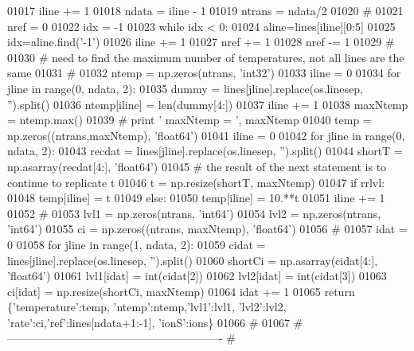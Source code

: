 \begin{DoxyCode}
01017         iline += 1
01018     ndata = iline - 1
01019     ntrans = ndata/2
01020     \textcolor{comment}{#}
01021     nref = 0
01022     idx = -1
01023     \textcolor{keywordflow}{while} idx < 0:
01024         aline=lines[iline][0:5]
01025         idx=aline.find(\textcolor{stringliteral}{'-1'})
01026         iline += 1
01027         nref += 1
01028     nref -= 1
01029     \textcolor{comment}{#}
01030     \textcolor{comment}{# need to find the maximum number of temperatures, not all lines are the same}
01031     \textcolor{comment}{#}
01032     ntemp = np.zeros(ntrans, \textcolor{stringliteral}{'int32'})
01033     iline = 0
01034     \textcolor{keywordflow}{for} jline \textcolor{keywordflow}{in} range(0, ndata, 2):
01035         dummy = lines[jline].replace(os.linesep, \textcolor{stringliteral}{''}).split()
01036         ntemp[iline] = len(dummy[4:])
01037         iline += 1
01038     maxNtemp = ntemp.max()
01039 \textcolor{comment}{#   print ' maxNtemp = ', maxNtemp}
01040     temp = np.zeros((ntrans,maxNtemp), \textcolor{stringliteral}{'float64'})
01041     iline = 0
01042     \textcolor{keywordflow}{for} jline \textcolor{keywordflow}{in} range(0, ndata, 2):
01043         recdat = lines[jline].replace(os.linesep, \textcolor{stringliteral}{''}).split()
01044         shortT = np.asarray(recdat[4:], \textcolor{stringliteral}{'float64'})
01045         \textcolor{comment}{# the result of the next statement is to continue to replicate t}
01046         t = np.resize(shortT, maxNtemp)
01047         \textcolor{keywordflow}{if} rrlvl:
01048             temp[iline] = t
01049         \textcolor{keywordflow}{else}:
01050             temp[iline] = 10.**t
01051         iline += 1
01052     \textcolor{comment}{#}
01053     lvl1 = np.zeros(ntrans, \textcolor{stringliteral}{'int64'})
01054     lvl2 = np.zeros(ntrans, \textcolor{stringliteral}{'int64'})
01055     ci = np.zeros((ntrans, maxNtemp), \textcolor{stringliteral}{'float64'})
01056     \textcolor{comment}{#}
01057     idat = 0
01058     \textcolor{keywordflow}{for} jline \textcolor{keywordflow}{in} range(1, ndata, 2):
01059         cidat = lines[jline].replace(os.linesep, \textcolor{stringliteral}{''}).split()
01060         shortCi = np.asarray(cidat[4:], \textcolor{stringliteral}{'float64'})
01061         lvl1[idat] = int(cidat[2])
01062         lvl2[idat] = int(cidat[3])
01063         ci[idat] = np.resize(shortCi, maxNtemp)
01064         idat += 1
01065     \textcolor{keywordflow}{return} \{\textcolor{stringliteral}{'temperature'}:temp, \textcolor{stringliteral}{'ntemp'}:ntemp,\textcolor{stringliteral}{'lvl1'}:lvl1, \textcolor{stringliteral}{'lvl2'}:lvl2, \textcolor{stringliteral}{'rate'}:ci,\textcolor{stringliteral}{'ref'}:lines[ndata+1:-1], \textcolor{stringliteral}{
      'ionS'}:ions\}
01066     \textcolor{comment}{#}
01067     \textcolor{comment}{# ----------------------------------------------------------}
    \textcolor{comment}{#}
\end{DoxyCode}
